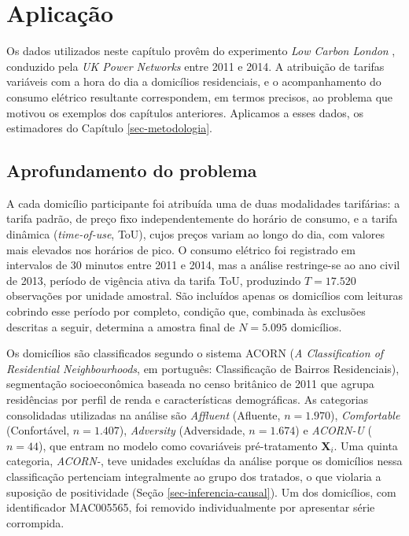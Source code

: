 \chapter[Aplicação]{Aplicação}\label{sec-aplicacoes}

Os dados utilizados neste capítulo provêm do experimento \emph{Low Carbon London} \cite{schofield2015lcl}, conduzido pela \emph{UK Power Networks} entre 2011 e 2014.
A atribuição de tarifas variáveis com a hora do dia a domicílios residenciais, e o acompanhamento do consumo elétrico resultante correspondem, em termos precisos, ao problema que motivou os exemplos dos capítulos anteriores.
Aplicamos a esses dados, os estimadores do Capítulo \ref{sec-metodologia}.

\section{Aprofundamento do problema}\label{sec-aplicacoes-problema}

A cada domicílio participante foi atribuída uma de duas modalidades tarifárias: a tarifa padrão, de preço fixo independentemente do horário de consumo, e a tarifa dinâmica (\emph{time-of-use}, ToU), cujos preços variam ao longo do dia, com valores mais elevados nos horários de pico. 
O consumo elétrico foi registrado em intervalos de 30 minutos entre 2011 e 2014, mas a análise restringe-se ao ano civil de 2013, período de vigência ativa da tarifa ToU, produzindo \(T = 17.520\) observações por unidade amostral.
São incluídos apenas os domicílios com leituras cobrindo esse período por completo, condição que, combinada às exclusões descritas a seguir, determina a amostra final de \(N = 5.095\) domicílios.

Os domicílios são classificados segundo o sistema ACORN (\emph{A Classification of Residential Neighbourhoods}, em português: Classificação de Bairros Residenciais), segmentação socioeconômica baseada no censo britânico de 2011 que agrupa residências por perfil de renda e características demográficas. 
As categorias consolidadas utilizadas na análise são \emph{Affluent} (Afluente, \(n = 1.970\)), \emph{Comfortable} (Confortável, \(n = 1.407\)), \emph{Adversity} (Adversidade, \(n = 1.674\)) e \emph{ACORN-U} (\(n = 44\)), que entram no modelo como covariáveis pré-tratamento \(\mathbf{X}_i\).
Uma quinta categoria, \emph{ACORN-}, teve unidades excluídas da análise porque os domicílios nessa classificação pertenciam integralmente ao grupo dos tratados, o que violaria a suposição de positividade (Seção \ref{sec-inferencia-causal}). 
Um dos domicílios, com identificador MAC005565, foi removido individualmente por apresentar série corrompida.

